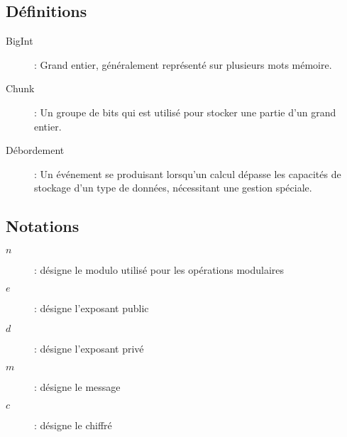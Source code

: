 \subsection{Définitions}
\begin{description}
    \item[BigInt] : Grand entier, généralement représenté sur plusieurs mots mémoire.
    \item[Chunk] : Un groupe de bits qui est utilisé pour stocker une partie d'un grand entier.
    \item[Débordement] : Un événement se produisant lorsqu'un calcul dépasse les capacités de stockage d'un type de données, nécessitant une gestion spéciale.
\end{description}

\subsection{Notations}
\begin{description}
    \item[$n$] : désigne le modulo utilisé pour les opérations modulaires
    \item[$e$] : désigne l'exposant public
    \item[$d$] : désigne l'exposant privé
    \item[$m$] : désigne le message
    \item[$c$] : désigne le chiffré
\end{description}

